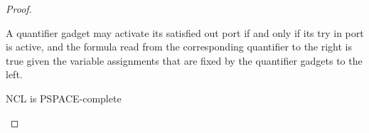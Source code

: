 \begin{proof}
\begin{lemma} \cite{goos_nondeterministic_2002}
A quantifier gadget may activate its satisfied out port if and only if its try in port is active, and the formula read from the corresponding quantifier to the right is true given the variable assignments that are fixed by the quantifier
gadgets to the left.
\end{lemma}

\begin{theorem}
NCL is PSPACE-complete
\cite{goos_nondeterministic_2002}
\end{theorem}

\end{proof}